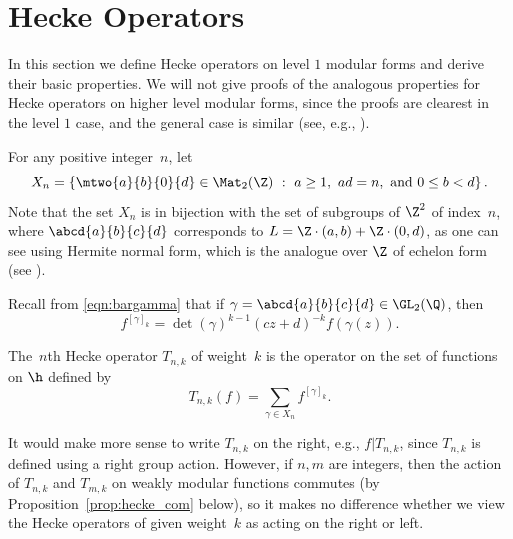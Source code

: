 \section{Hecke Operators}\label{sec:hecke_one}
In this section we define Hecke operators on level $1$ modular forms and
derive their basic properties.  We will not give proofs of the
analogous properties for Hecke operators on higher level modular
forms, since the proofs are clearest in the level $1$ case, and the
general case is similar (see, e.g., \cite{lang:modular}).

For any positive integer~$n$, let
$$
X_n = \left\{\mtwo{a}{b}{0}{d} \in \Mat_2(\Z) \,\,:\,\,
a\geq 1,\,\, ad=n, \text{ and } 0\leq b <d\right\}.
$$
Note that the set $X_n$ is in bijection with the set of subgroups of
$\Z^2$ of index~$n$, where $\abcd{a}{b}{c}{d}$ corresponds to
$L=\Z\cdot (a,b) + \Z\cdot (0,d)$, as one can see using
Hermite normal form, which is the analogue over $\Z$ of 
echelon form (see ).

Recall from \eqref{eqn:bargamma} that
if $\gamma=\abcd{a}{b}{c}{d}\in\GL_2(\Q)$, then
$$
   f^{[\gamma]_k} = \det(\gamma)^{k-1} (cz+d)^{-k} f(\gamma(z)). 
$$


\begin{definition}\label{defn:hecke_op}
The~$n$th Hecke operator $T_{n,k}$ of weight~$k$
is the operator on the set of functions on $\h$ defined by
$$
T_{n,k}(f) = \sum_{\gamma \in X_n} 
f^{[\gamma]_k}.
$$
\end{definition}
\begin{remark}
  It would make more sense to write $T_{n,k}$ on the right, e.g.,
  $f|T_{n,k}$, since $T_{n,k}$ is defined using
  a right group action.
  However, if $n,m$ are integers, then the action of $T_{n,k}$ and
  $T_{m,k}$ on weakly modular functions commutes (by
  Proposition~\ref{prop:hecke_com} below), so it makes no difference
  whether we view the Hecke operators of given weight~$k$ as
  acting on the right or left.
\end{remark}

